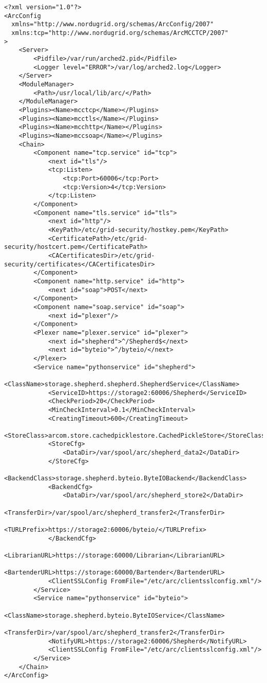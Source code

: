 \documentclass{book}
\begin{document}
\begin{verbatim}
<?xml version="1.0"?>
<ArcConfig 
  xmlns="http://www.nordugrid.org/schemas/ArcConfig/2007"
  xmlns:tcp="http://www.nordugrid.org/schemas/ArcMCCTCP/2007"
>
    <Server>
        <Pidfile>/var/run/arched2.pid</Pidfile>
        <Logger level="ERROR">/var/log/arched2.log</Logger>
    </Server>
    <ModuleManager>
        <Path>/usr/local/lib/arc/</Path>
    </ModuleManager>
    <Plugins><Name>mcctcp</Name></Plugins>
    <Plugins><Name>mcctls</Name></Plugins>
    <Plugins><Name>mcchttp</Name></Plugins>
    <Plugins><Name>mccsoap</Name></Plugins>
    <Chain>
        <Component name="tcp.service" id="tcp">
            <next id="tls"/> 
            <tcp:Listen>
                <tcp:Port>60006</tcp:Port>
                <tcp:Version>4</tcp:Version>
            </tcp:Listen>
        </Component>
        <Component name="tls.service" id="tls">
            <next id="http"/>
            <KeyPath>/etc/grid-security/hostkey.pem</KeyPath>
            <CertificatePath>/etc/grid-security/hostcert.pem</CertificatePath>
            <CACertificatesDir>/etc/grid-security/certificates</CACertificatesDir>
        </Component>
        <Component name="http.service" id="http">
            <next id="soap">POST</next>
        </Component>
        <Component name="soap.service" id="soap">
            <next id="plexer"/>
        </Component>
        <Plexer name="plexer.service" id="plexer">
            <next id="shepherd">^/Shepherd$</next>
            <next id="byteio">^/byteio/</next>
        </Plexer>
        <Service name="pythonservice" id="shepherd">
            <ClassName>storage.shepherd.shepherd.ShepherdService</ClassName>
            <ServiceID>https://storage2:60006/Shepherd</ServiceID>
            <CheckPeriod>20</CheckPeriod>
            <MinCheckInterval>0.1</MinCheckInterval>
            <CreatingTimeout>600</CreatingTimeout>
            <StoreClass>arcom.store.cachedpicklestore.CachedPickleStore</StoreClass>
            <StoreCfg>
                <DataDir>/var/spool/arc/shepherd_data2</DataDir>
            </StoreCfg>
            <BackendClass>storage.shepherd.byteio.ByteIOBackend</BackendClass>
            <BackendCfg>
                <DataDir>/var/spool/arc/shepherd_store2</DataDir>
                <TransferDir>/var/spool/arc/shepherd_transfer2</TransferDir>
                <TURLPrefix>https://storage2:60006/byteio/</TURLPrefix>
            </BackendCfg>
            <LibrarianURL>https://storage:60000/Librarian</LibrarianURL>
            <BartenderURL>https://storage:60000/Bartender</BartenderURL>
            <ClientSSLConfig FromFile="/etc/arc/clientsslconfig.xml"/>
        </Service>
        <Service name="pythonservice" id="byteio">
            <ClassName>storage.shepherd.byteio.ByteIOService</ClassName>
            <TransferDir>/var/spool/arc/shepherd_transfer2</TransferDir>
            <NotifyURL>https://storage2:60006/Shepherd</NotifyURL>
            <ClientSSLConfig FromFile="/etc/arc/clientsslconfig.xml"/>
        </Service>
    </Chain>
</ArcConfig>    
\end{verbatim}
\end{document}
